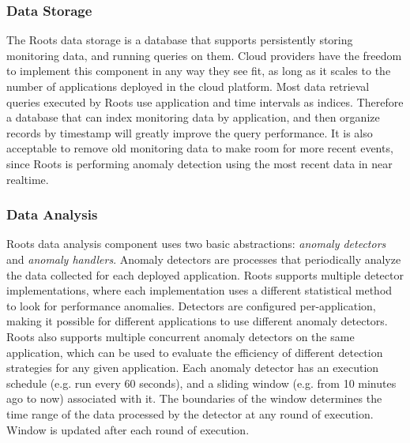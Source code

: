 \subsubsection{Data Storage}

The Roots data storage is a database that supports persistently storing monitoring data, and running
queries on them.  
Cloud providers have the freedom to implement this component in any way they see fit, as long
as it scales to the number of applications deployed in the cloud platform. Most data retrieval queries executed
by Roots use application and time intervals as indices. Therefore a database that can index monitoring
data by application, and then organize records by timestamp will greatly improve the query performance.
It is also acceptable to remove old monitoring data to make room for more recent events, since Roots
is performing anomaly detection using the most recent data in near realtime.

\subsubsection{Data Analysis}

Roots data analysis component uses two basic abstractions: \textit{anomaly detectors} 
and \textit{anomaly handlers}.
Anomaly detectors are processes that periodically analyze the data collected for
each deployed application. Roots supports multiple detector implementations, where each implementation
uses a different statistical method to look for performance anomalies. Detectors are configured
per-application, making it possible for different applications to use different anomaly 
detectors. Roots also supports multiple concurrent anomaly detectors on the same application, which can be used
to evaluate the efficiency of different detection strategies for any given application. Each
anomaly detector has an execution schedule (e.g. run every 60 seconds), and a sliding window 
(e.g. from 10 minutes ago to now)
associated with it. The boundaries of the window determines the time range
of the data processed by the detector at any round of execution. Window is updated 
after each round of execution. 

